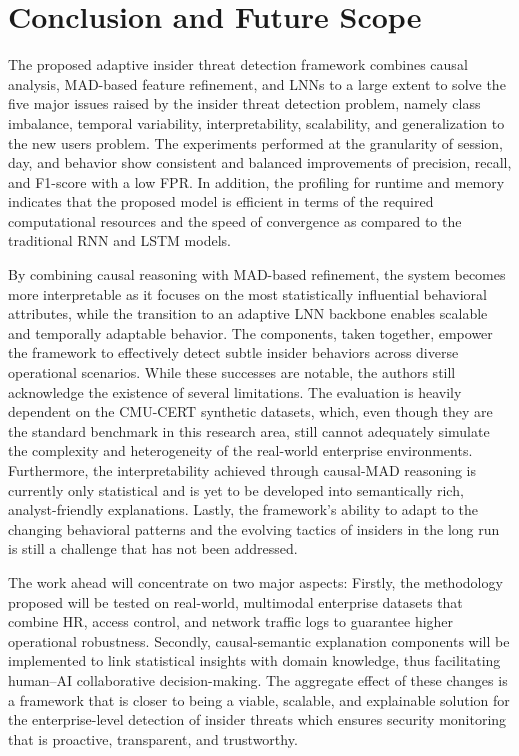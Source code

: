 \chapter{Conclusion and Future Scope}\label{conclusion}
The proposed adaptive insider threat detection framework combines causal analysis, MAD-based feature refinement, and LNNs to a large extent to solve the five major issues raised by the insider threat detection problem, namely class imbalance, temporal variability, interpretability, scalability, and generalization to the new users problem. The experiments performed at the granularity of session, day, and behavior show consistent and balanced improvements of precision, recall, and F1-score with a low FPR. In addition, the profiling for runtime and memory indicates that the proposed model is efficient in terms of the required computational resources and the speed of convergence as compared to the traditional RNN and LSTM models. 

By combining causal reasoning with MAD-based refinement, the system becomes more interpretable as it focuses on the most statistically influential behavioral attributes, while the transition to an adaptive LNN backbone enables scalable and temporally adaptable behavior. The components, taken together, empower the framework to effectively detect subtle insider behaviors across diverse operational scenarios. 
While these successes are notable, the authors still acknowledge the existence of several limitations. The evaluation is heavily dependent on the CMU-CERT synthetic datasets, which, even though they are the standard benchmark in this research area, still cannot adequately simulate the complexity and heterogeneity of the real-world enterprise environments. Furthermore, the interpretability achieved through causal-MAD reasoning is currently only statistical and is yet to be developed into semantically rich, analyst-friendly explanations. Lastly, the framework’s ability to adapt to the changing behavioral patterns and the evolving tactics of insiders in the long run is still a challenge that has not been addressed. 

The work ahead will concentrate on two major aspects: Firstly, the methodology proposed will be tested on real-world, multimodal enterprise datasets that combine HR, access control, and network traffic logs to guarantee higher operational robustness. Secondly, causal-semantic explanation components will be implemented to link statistical insights with domain knowledge, thus facilitating human–AI collaborative decision-making. The aggregate effect of these changes is a framework that is closer to being a viable, scalable, and explainable solution for the enterprise-level detection of insider threats which ensures security monitoring that is proactive, transparent, and trustworthy.
